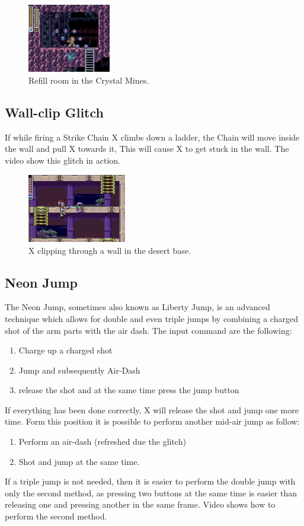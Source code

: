 \begin{itemize}
	\begin{figure}[htp]
		\centering
		\includegraphics[height=3cm]{figures/X2/Crystal_snail/Crystal_farming_spot.png}
		\caption{Refill room in the Crystal Mines.}
	\end{figure}
\end{itemize}

\subsection{Wall-clip Glitch}
If while firing a Strike Chain X climbs down a ladder, the Chain will move inside the wall and pull X towards it, This will cause X to get stuck in the wall. The video  show this glitch in action.

\begin{figure}[htp]
	\centering
	\includegraphics[height=3cm]{figures/X2/Miscs/Chain_clip.jpg}
	\caption{X clipping through a wall in the desert base.}
\end{figure}

\subsection{Neon Jump}\label{Neon_jump}
The Neon Jump, sometimes also known as Liberty Jump, is an advanced technique which allows for double and even triple jumps by combining a charged shot of the arm parts with the air dash. The input command are the following:
\begin{enumerate}
	\item Charge up a charged shot
	\item Jump and subsequently Air-Dash 
	\item release the shot and at the same time press the jump button
\end{enumerate}
If everything has been done correctly, X will release the shot and jump one more time. Form this position it is possible to perform another mid-air jump as follow:
\begin{enumerate}
	\item Perform an air-dash (refreshed due the glitch)
	\item Shot and jump at the same time.
\end{enumerate}
If a triple jump is not needed, then it is easier to perform the double jump with only the second method, as pressing two buttons at the same time is easier than releasing one and pressing another in the same frame. Video  shows how to perform the second method.

